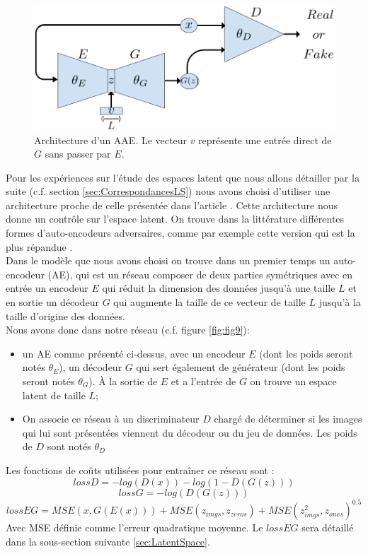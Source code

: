 \documentclass[11pt,francais]{article}
\begin{document}
\begin{figure}[h!]
    \centering
    \includegraphics[width=\textwidth]{Figures/GAN/AAE_representation.png}
    \caption{Architecture d'un AAE. Le vecteur \(v\) représente une entrée direct de \(G\) sans passer par \(E\).}
    \label{fig:fig10}
\end{figure}

Pour les expériences sur l'étude des espaces latent que nous allons détailler par la suite (c.f. section \ref{sec:CorrespondancesLS}) nous avons choisi d'utiliser une architecture proche de celle présentée dans l'article \cite{GADAE}. Cette architecture nous donne un contrôle sur l'espace latent.
On trouve dans la littérature différentes formes d'auto-encodeurs adversaires, comme par exemple cette version qui est la plus répandue \cite{makhzani2015adversarial}.\\
Dans le modèle que nous avons choisi on trouve dans un premier temps un auto-encodeur (AE), qui est un réseau composer de deux parties symétriques avec en entrée un encodeur \(E\) qui réduit la dimension des données jusqu'à une taille \(L\) et en sortie un décodeur \(G\) qui augmente la taille de ce vecteur de taille \(L\) jusqu'à la taille d'origine des données. \\
Nous avons donc dans notre réseau (c.f. figure \ref{fig:fig9}):
\begin{itemize}
  \item un AE comme présenté ci-dessus, avec un encodeur \(E\) (dont les poids seront notés \(\theta_E\)), un décodeur \(G\) qui sert également de générateur (dont les poids seront notés \(\theta_G\)). À la sortie de \(E\) et a l'entrée de \(G\) on trouve un espace latent de taille \(L\);
  \item On associe ce réseau à un discriminateur \(D\) chargé de déterminer si les images qui lui sont présentées viennent du décodeur ou du jeu de données. Les poids de \(D\) sont notés \(\theta_D\) 
\end{itemize}
Les fonctions de coûts utilisées pour entraîner ce réseau sont :
\[
lossD = -log(D(x)) - log(1-D(G(z)))
\]
\[
lossG = -log(D(G(z)))
\]
\[
lossEG = MSE(x, G(E(x))) + MSE(z_{imgs}, z_{zeros}) + MSE(z_{imgs}^2, z_{ones})^{0.5}
\]
Avec MSE définie comme l'erreur quadratique moyenne.
Le \(lossEG\) sera détaillé dans la sous-section suivante \ref{sec:LatentSpace}.
\end{document}
